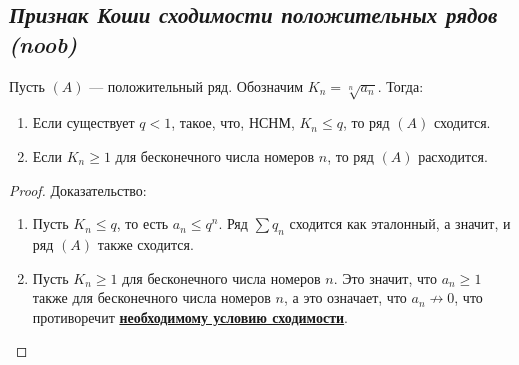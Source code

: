 \subsection{\itshape Признак Коши сходимости положительных рядов (noob)} \hypertarget{Коши-нуб}{}

\begin{theorem}
	Пусть \((A)\) --- положительный ряд. Обозначим \(K_n = \sqrt[n]{a_n}\). Тогда:
	\begin{enumerate}
		\item Если существует \(q < 1\), такое, что, НСНМ, \(K_n \leqslant q\), то ряд \((A)\) сходится.
		\item Если \(K_n \geqslant 1\) для бесконечного числа номеров \(n\), то ряд \((A)\) расходится.
	\end{enumerate}
\end{theorem}
\begin{proof}
	Доказательство:
	\begin{enumerate}
		\item Пусть  \(K_n \leqslant q\), то есть \(a_n \leqslant q^n\). Ряд \(\sum q_n\) сходится как эталонный, а значит, и ряд \((A)\) также сходится.
		\item Пусть \(K_n \geqslant 1\) для бесконечного числа номеров \(n\). Это значит, что \(a_n \geqslant 1\) также для бесконечного числа номеров \(n\), а это означает, что \(a_n \not\to 0\), что противоречит \hyperlink{необходимое условие сходимости}{\bfseries необходимому условию сходимости}.
	\end{enumerate}
\end{proof}